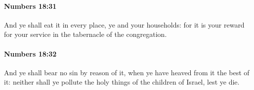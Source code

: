 		\paragraph{Numbers 18:31} %
			\label{NUMBERS-18-31}

			And ye shall eat it in every place, ye and your households: for it is your reward for your service in the tabernacle of the congregation.


		\paragraph{Numbers 18:32} %
			\label{NUMBERS-18-32}

			And ye shall bear no sin by reason of it, when ye have heaved from it the best of it: neither shall ye pollute the holy things of the children of Israel, lest ye die.

